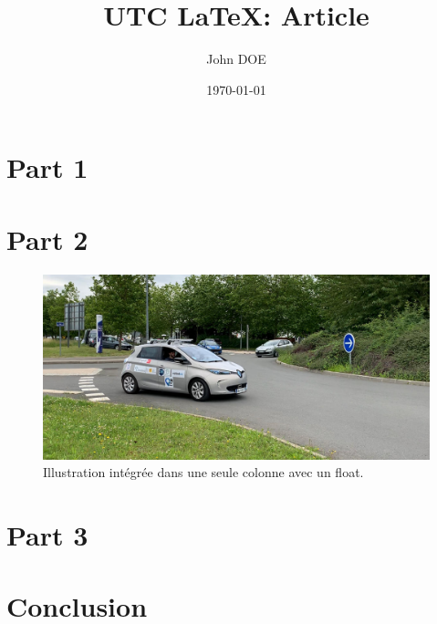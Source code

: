 \documentclass[a4paper,12pt]{article}
\title{UTC \LaTeX : Article}
\author{John DOE}
\date{\today}
\begin{document}
\articletitle

\begin{multicols}{2}

\section{Part 1}
\lipsum[1][1]
\lipsum[1][2]
\lipsum[1][3]
\lipsum[1][4]
\lipsum[1][5]

\section{Part 2}
\lipsum[2][1]

\begin{figure}[H]
\centering
\includegraphics[width=\linewidth]{img/zoe_hds.jpg}
\caption{Illustration intégrée dans une seule colonne avec un float.}
\end{figure}

\lipsum[2][2]
\lipsum[2][3]
\lipsum[2][4]

\section{Part 3}
\lipsum[3]

\section{Conclusion}
\lipsum[4]

\end{multicols}
\end{document}
